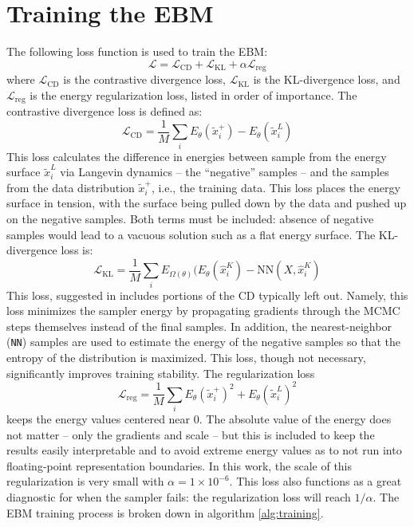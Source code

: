 \section{Training the EBM}
The following loss function is used to train the EBM:
\begin{equation}
	\mathcal{L} = \mathcal{L}_\text{CD} + \mathcal{L}_\text{KL} + \alpha \mathcal{L}_\text{reg}
\end{equation}
where $\mathcal{L}_\text{CD}$ is the contrastive divergence loss, $\mathcal{L}_\text{KL}$ is the KL-divergence loss, and $\mathcal{L}_\text{reg}$ is the energy regularization loss, listed in order of importance.
The contrastive divergence loss is defined as:
\begin{equation}
	\mathcal{L}_\text{CD} = \frac{1}{M} \sum_i E_\theta(\tilde{x}_{i}^+) - E_\theta(\tilde{x}_{i}^L)
\end{equation}
This loss calculates the difference in energies between sample from the energy surface $\tilde{x}_{i}^L$ via Langevin dynamics -- the ``negative'' samples -- and the samples from the data distribution $\tilde{x}_{i}^+$, i.e., the training data. This loss places the energy surface in tension, with the surface being pulled down by the data and pushed up on the negative samples. Both terms must be included: absence of negative samples would lead to a vacuous solution such as a flat energy surface.
The KL-divergence loss is:
\begin{equation}
	\mathcal{L}_\text{KL} = \frac{1}{M} \sum_i E_{\Omega(\theta)}(E_\theta(\hat{x}_{i}^K) - \text{NN}(X, \hat{x}_{i}^K)
\end{equation}
This loss, suggested in \cite{du_improved_2021} includes portions of the CD typically left out. Namely, this loss minimizes the sampler energy by propagating gradients through the MCMC steps themselves instead of the final samples. In addition, the nearest-neighbor (\texttt{NN}) samples are used to estimate the energy of the negative samples so that the entropy of the distribution is maximized. This loss, though not necessary, significantly improves training stability. 
The regularization loss
\begin{equation}
	\mathcal{L}_\text{reg} = \frac{1}{M} \sum_i E_\theta(\tilde{x}_{i}^+)^2 + E_\theta(\tilde{x}_{i}^L)^2
\end{equation}
keeps the energy values centered near 0. The absolute value of the energy does not matter -- only the gradients and scale -- but this  is included to keep the results easily interpretable and to avoid extreme energy values as to not run into floating-point representation boundaries. In this work, the scale of this regularization is very small with $\alpha = 1 \times 10^{-6}$. This loss also functions as a great diagnostic for when the sampler fails: the regularization loss will reach $1/\alpha$. The EBM training process is broken down in algorithm \ref{alg:training}.

